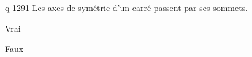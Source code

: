 \begin{truefalse}{q-1291}
Les axes de symétrie d'un carré  passent par ses sommets.
\item Vrai
\item* Faux
\end{truefalse}

